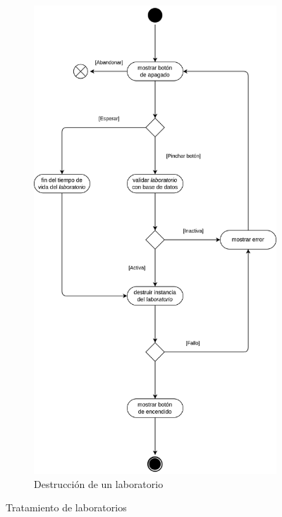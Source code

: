 \begin{figure}[h]
                \hfill
                \begin{subfigure}{0.45\textwidth}
                    \centering
                    \includegraphics[scale=0.115]{images/Diagramas/Actividades y transiciones 5.png}
                    \caption{Destrucción de un laboratorio}
                    \label{fig:destruccion-laboratorio}
                \end{subfigure}

                \caption{Tratamiento de laboratorios}
                \label{fig:tratamiento-laboratorios}
            \end{figure}
            
